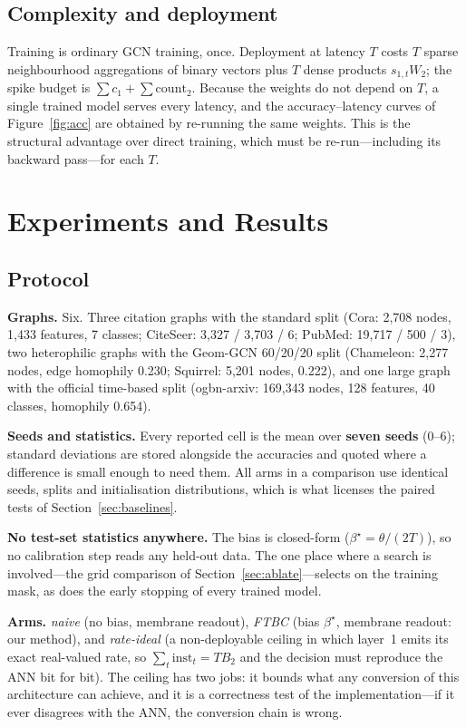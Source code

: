 \documentclass[10pt,twocolumn]{article}
\newcommand{\Btwo}{B_{2}}
\newcommand{\betastar}{\beta^{\star}}
\newcommand{\cntone}{c_{1}}
\newcommand{\figref}[1]{Figure~\ref{#1}}
\newcommand{\secref}[1]{Section~\ref{#1}}
\begin{document}
\subsection{Complexity and deployment}
\label{sec:complexity}

Training is ordinary GCN training, once. Deployment at latency $T$ costs $T$ sparse neighbourhood
aggregations of binary vectors plus $T$ dense products $s_{1,t}W_{2}$; the spike budget is
$\sum\cntone + \sum \mathrm{count}_{2}$. Because the weights do not depend on $T$, a single trained
model serves every latency, and the accuracy--latency curves of \figref{fig:acc} are obtained by
re-running the same weights. This is the structural advantage over direct training, which must be
re-run---including its backward pass---for each $T$.
\section{Experiments and Results}
\label{sec:exp}

\subsection{Protocol}
\label{sec:protocol}

\textbf{Graphs.} Six. Three citation graphs with the standard split (Cora: 2{,}708 nodes,
1{,}433 features, 7 classes; CiteSeer: 3{,}327 / 3{,}703 / 6; PubMed: 19{,}717 / 500 / 3), two
heterophilic graphs with the Geom-GCN 60/20/20 split (Chameleon: 2{,}277 nodes, edge homophily
0.230; Squirrel: 5{,}201 nodes, 0.222), and one large graph with the official time-based split
(ogbn-arxiv: 169{,}343 nodes, 128 features, 40 classes, homophily 0.654).

\textbf{Seeds and statistics.} Every reported cell is the mean over \textbf{seven seeds} (0--6);
standard deviations are stored alongside the accuracies and quoted where a difference is small
enough to need them. All arms in a comparison use identical seeds, splits and initialisation
distributions, which is what licenses the paired tests of \secref{sec:baselines}.

\textbf{No test-set statistics anywhere.} The bias is closed-form ($\betastar = \theta/(2T)$), so
no calibration step reads any held-out data. The one place where a search is involved---the grid
comparison of \secref{sec:ablate}---selects on the training mask, as does the early stopping of
every trained model.

\textbf{Arms.} \emph{naive} (no bias, membrane readout), \emph{FTBC} (bias $\betastar$, membrane
readout: our method), and \emph{rate-ideal} (a non-deployable ceiling in which layer~1 emits its
exact real-valued rate, so $\sum_{t}\mathrm{inst}_{t} = T\Btwo$ and the decision must reproduce the
ANN bit for bit). The ceiling has two jobs: it bounds what any conversion of this architecture can
achieve, and it is a correctness test of the implementation---if it ever disagrees with the ANN, the
conversion chain is wrong.
\end{document}
